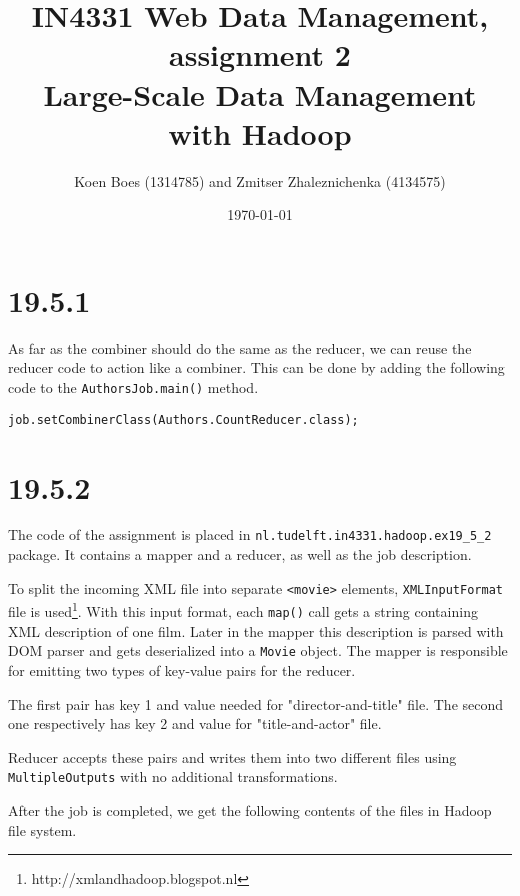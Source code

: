 \documentclass[a4paper, notitlepage]{article}
\begin{document}
\title{IN4331 Web Data Management, assignment 2 \\
Large-Scale Data Management with Hadoop}
\author{Koen Boes (1314785) and Zmitser Zhaleznichenka (4134575)}
\date{\today}
\maketitle

\setcounter{secnumdepth}{0}

\section{19.5.1}

As far as the combiner should do the same as the reducer, we can reuse the reducer code to action like a combiner. This can be done by adding the following code to the \lstinline{AuthorsJob.main()} method.

\begin{lstlisting}
job.setCombinerClass(Authors.CountReducer.class);  
\end{lstlisting}

\section{19.5.2}

The code of the assignment is placed in \lstinline{nl.tudelft.in4331.hadoop.ex19_5_2} package. It contains a mapper and a reducer, as well as the job description.

To split the incoming XML file into separate \lstinline{<movie>} elements, \lstinline{XMLInputFormat} file is used\footnote{http://xmlandhadoop.blogspot.nl}. With this input format, each \lstinline{map()} call gets a string containing XML description of one film. Later in the mapper this description is parsed with DOM parser and gets deserialized into a \lstinline{Movie} object. The mapper is responsible for emitting two types of key-value pairs for the reducer.

The first pair has key 1 and value needed for "director-and-title" file. The second one respectively has key 2 and value for "title-and-actor" file.

Reducer accepts these pairs and writes them into two different files using \lstinline{MultipleOutputs} with no additional transformations. 

After the job is completed, we get the following contents of the files in Hadoop file system.
\end{document}
